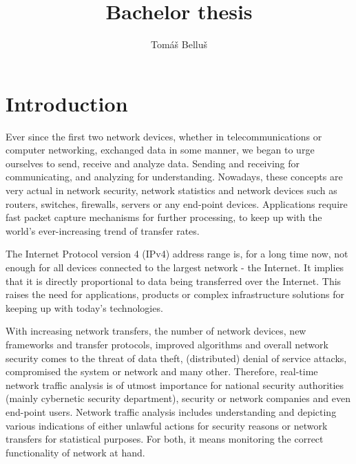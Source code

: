 \documentclass[12pt,a4paper,twoside]{book}
\title{Bachelor thesis}
\author{Tomáš Belluš}
\begin{document}


\thispagestyle{empty}



\newpage{}\thispagestyle{empty}

\newpage
\thispagestyle{empty}
\mbox{}
\newpage







\begingroup
\color{black}
\tableofcontents
\endgroup

\chapter{Introduction}
    Ever since the first two network devices, whether in telecommunications or computer networking, exchanged data in some manner, we began to urge ourselves to send, receive and analyze data. Sending and receiving for communicating, and analyzing for understanding. Nowadays, these concepts are very actual in network security, network statistics and network devices such as routers, switches, firewalls, servers or any end-point devices. Applications require fast packet capture mechanisms for further processing, to keep up with the world's ever-increasing trend of transfer rates.\par
    The Internet Protocol version 4 (IPv4) address range is, for a long time now, not enough for all devices connected to the largest network - the Internet. It implies that it is directly proportional to data being transferred over the Internet. This raises the need for applications, products or complex infrastructure solutions for keeping up with today's technologies. \par
    With increasing network transfers, the number of network devices, new frameworks and transfer protocols, improved algorithms and overall network security comes to the threat of data theft, (distributed) denial of service attacks, compromised the system or network and many other. Therefore, real-time network traffic analysis is of utmost importance for national security authorities (mainly cybernetic security department), security or network companies and even end-point users. Network traffic analysis includes understanding and depicting various indications of either unlawful actions for security reasons or network transfers for statistical purposes. For both, it means monitoring the correct functionality of network at hand.\par
\end{document}
